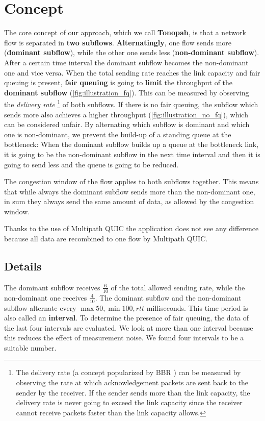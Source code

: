 \documentclass[conference]{IEEEtran}
\begin{document}
\section{Concept}

The core concept of our approach, which we call \textbf{Tonopah}, is that a network flow is separated in \textbf{two subflows}. 
\textbf{Alternatingly}, one flow sends more (\textbf{dominant subflow}), while the other one sends less (\textbf{non-dominant subflow}). After a certain time interval the dominant subflow becomes the non-dominant one and vice versa. 
When the total sending rate reaches the link capacity and fair queuing is present, \textbf{fair queuing} is going to \textbf{limit} the throughput of the \textbf{dominant subflow} (\autoref{fig:illustration_fq}). This can be measured by observing the \textit{delivery rate}
\footnote{The delivery rate (a concept popularized by BBR \cite{cardwell_bbr_2016}) can be measured by observing the rate at which acknowledgement packets are sent back to the sender by the receiver.
If the sender sends more than the link capacity, the delivery rate is never going to exceed the link capacity since the receiver cannot receive packets faster than the link capacity allows. 
}
of both subflows. If there is no fair queuing, the subflow which sends more also achieves a higher throughput (\autoref{fig:illustration_no_fq}), which can be considered unfair. By alternating which subflow is dominant and which one is non-dominant, we prevent the build-up of a standing queue at the bottleneck: 
When the dominant subflow builds up a queue at the bottleneck link, it is going to be the non-dominant subflow in the next time interval and then it is going to send less and the queue is going to be reduced. 

The congestion window of the flow applies to both subflows together. This means that while always the dominant subflow sends more than the non-dominant one, in sum they always send the same amount of data, as allowed by the congestion window.

Thanks to the use of Multipath QUIC \cite{liu_multipath_2022} the application does not see any difference because all data are recombined to one flow by Multipath QUIC. 

\subsection{Details}

The dominant subflow receives $\frac{6}{10}$ of the total allowed sending rate, while the non-dominant one receives $\frac{4}{10}$. 
The dominant subflow and the non-dominant subflow alternate every $\max{50, \min{100, \textit{rtt}}}$ milliseconds. 
This time period is also called an \textbf{interval}. To determine the presence of fair queuing, the data of the last four intervals are evaluated. 
We look at more than one interval because this reduces the effect of measurement noise. We found four intervals to be a suitable number. 
\end{document}
